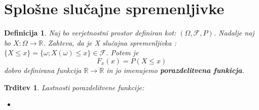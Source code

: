 \documentclass[11pt]{article}
\newtheorem{Trditev}[Izrek]{{\sc Trditev}}
\newtheorem{Definicija}[Izrek]{{\sc Definicija}}
\begin{document}
\section{Splošne slučajne spremenljivke}
\begin{Definicija}
	Naj bo verjetnostni prostor definiran kot: $(\Omega, \mathcal{F},P)$. Nadalje naj bo $X: \Omega \to \mathbb{R}$. Zahteva, da je X slučajna spremenljivka : $\{ X\le x\} = \{\omega ; X(\omega) \le x\} \in \mathcal{F}$. Potem je $$F_x(x)  = P(X \le x)$$ dobro definirana funkcija $\mathbb{R}\to \mathbb{R}$ in jo imenujemo \textbf{porazdelitvena funkicja}.
\end{Definicija}
\begin{Trditev}
	Lastnosti porazdelitvene funkcije:
	\begin{itemize}
		\item
		
	\end{itemize}
\end{Trditev}
\end{document}
